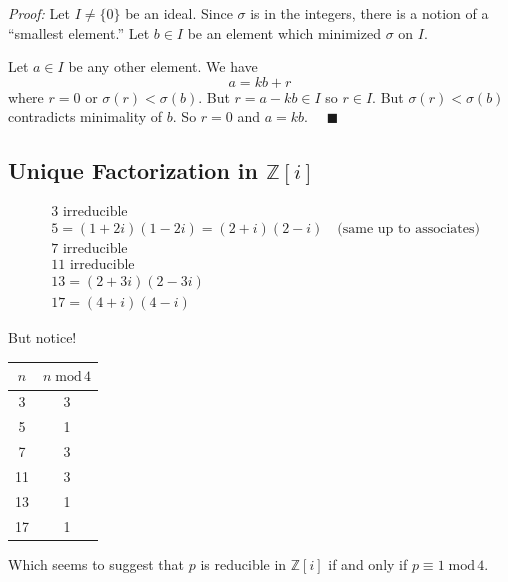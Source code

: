 \documentclass[12pt]{report}
\newcommand{\qed}{\quad \blacksquare}
\newcommand{\Z}{\mathbb{Z}}
\renewcommand{\mod}{\; \text{mod}\, }
\newenvironment*{tbox}[3][breakable]{
    \begin{tcolorbox}[
        parbox=false,
        colback=#2!5!white,
        colframe=#2!75!black,
        title={#3},
        #1
    ]}
    {\end{tcolorbox}}
\begin{document}
        \begin{tbox}{gray}{\textbf{Theorem:} If a ring is a Euclidean Domain, it is a PID}
            \emph{Proof:} Let $I \neq \{0\}$ be an ideal. Since $\sigma$ is in the integers, there is a notion of a ``smallest element.'' Let $b \in I$ be an element which minimized $\sigma$ on $I$. 

            Let $a \in I$ be any other element. We have 
            \[a = kb + r\]
            where $r = 0$ or $\sigma(r) < \sigma(b)$. But $r = a - kb \in I$ so $r \in I$. But $\sigma(r) < \sigma(b)$ contradicts minimality of $b$. So $r = 0$ and $a = kb$. $\qed$
        \end{tbox}

    \subsection*{Unique Factorization in $\Z[i]$}
        \begin{align*}
            &3 \text{ irreducible}\\
            &5 = (1 + 2i)(1 - 2i) = (2 + i)(2 - i) \quad \text{(same up to associates)}\\
            &7 \text{ irreducible}\\
            &11 \text{ irreducible}\\
            &13 = (2 + 3i)(2 - 3i)\\
            &17 = (4 + i)(4 - i)
        \end{align*}

        But notice! 
        \begin{center}
            \begin{tabular}{|c|c|}
                \hline 
                $n$ & $n \mod 4$\\
                \hline
                3 & 3\\
                5 & 1\\ 
                7 & 3\\
                11 & 3\\
                13 & 1\\
                17 & 1\\
                \hline
            \end{tabular}
        \end{center}
        Which seems to suggest that $p$ is reducible in $\Z[i]$ if and only if $p \equiv 1 \mod 4$.
\end{document}
